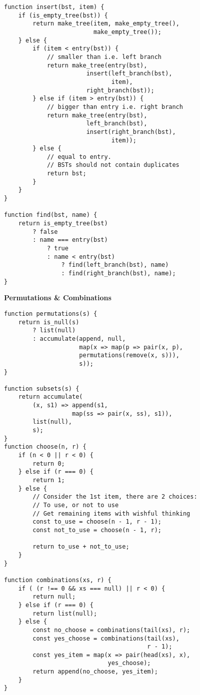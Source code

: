 \documentclass[a4paper]{article} \usepackage[backend=biber, style=numeric, sorting=none]{biblatex}
\begin{document}
\begin{multicols*}{4}
\begin{verbatim}
function insert(bst, item) {
    if (is_empty_tree(bst)) {
        return make_tree(item, make_empty_tree(),
        				 make_empty_tree());
    } else {
        if (item < entry(bst)) {
            // smaller than i.e. left branch
            return make_tree(entry(bst),
                       insert(left_branch(bst),
                              item),
                       right_branch(bst));
        } else if (item > entry(bst)) {
            // bigger than entry i.e. right branch
            return make_tree(entry(bst),
                       left_branch(bst),
                       insert(right_branch(bst),
                              item));
        } else {
            // equal to entry.
            // BSTs should not contain duplicates
            return bst;
        }
    }
}

function find(bst, name) {
    return is_empty_tree(bst)
        ? false
        : name === entry(bst)
            ? true
            : name < entry(bst)
                ? find(left_branch(bst), name)
                : find(right_branch(bst), name);
}
\end{verbatim}

{\small\textbf{Permutations \& Combinations}}
\begin{verbatim}
function permutations(s) {
    return is_null(s)
        ? list(null)
        : accumulate(append, null,
                     map(x => map(p => pair(x, p),
                     permutations(remove(x, s))),
                     s));
}

function subsets(s) {
    return accumulate(
        (x, s1) => append(s1,
                   map(ss => pair(x, ss), s1)),
        list(null),
        s);
}
function choose(n, r) {
    if (n < 0 || r < 0) {
        return 0;
    } else if (r === 0) {
        return 1;
    } else {
        // Consider the 1st item, there are 2 choices:
        // To use, or not to use
        // Get remaining items with wishful thinking
        const to_use = choose(n - 1, r - 1);
        const not_to_use = choose(n - 1, r);
        
        return to_use + not_to_use;
    }
}

function combinations(xs, r) {
    if ( (r !== 0 && xs === null) || r < 0) {
        return null;
    } else if (r === 0) {
        return list(null);
    } else {
        const no_choose = combinations(tail(xs), r);
        const yes_choose = combinations(tail(xs),
                                        r - 1);
        const yes_item = map(x => pair(head(xs), x),
                             yes_choose);
        return append(no_choose, yes_item);
    }
}


\end{verbatim}
\end{multicols*}
\end{document}

